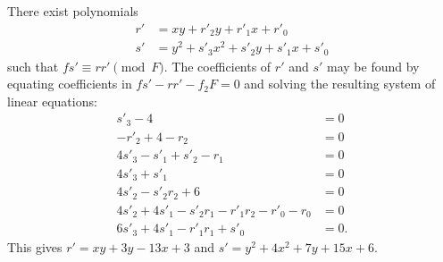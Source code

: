There exist polynomials
\begin{align*}
  r' &= xy + r'_2y + r'_1x + r'_0 \\
  s' &= y^2 + s'_3x^2 + s'_2y + s'_1x + s'_0
\end{align*}
such that $fs' \equiv rr' \pmod F$.
The coefficients of $r'$ and $s'$ may be found by equating coefficients in $fs' - rr' - f_2F = 0$
and solving the resulting system of linear equations:
\begin{align*}
  s'_3 - 4 &= 0 \\
  -r'_2 + 4 - r_2 &= 0 \\
  4s'_3 - s'_1 + s'_2 - r_1 &= 0 \\
  4s'_3 + s'_1 &= 0 \\
  4s'_2 - s'_2r_2 + 6 &= 0 \\
  4s'_2 + 4s'_1 - s'_2r_1 - r'_1r_2 - r'_0 - r_0 &= 0 \\
  6s'_3 + 4s'_1 - r'_1r_1 + s'_0 &= 0.
\end{align*}
This gives $r' = xy + 3y - 13x + 3$ and $s' = y^2 + 4x^2 + 7y + 15x + 6$.

